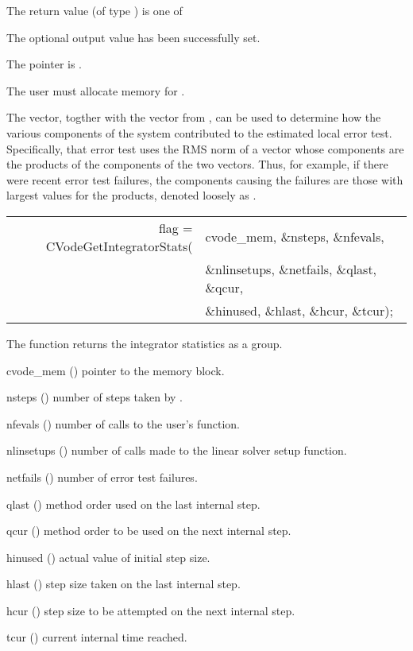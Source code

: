 {
  The return value  (of type ) is one of
  \begin{args}
  \item[\Id{CV\_SUCCESS}] 
    The optional output value has been successfully set.
  \item[\Id{CV\_MEM\_NULL}]
    The  pointer is .
  \end{args}
}
{
  {\warn}The user must allocate memory for .

  The  vector, togther with the  vector from
  , can be used to determine how the various
  components of the system contributed to the estimated local error
  test.  Specifically, that error test uses the RMS norm of a vector
  whose components are the products of the components of the two vectors.
  Thus, for example, if there were recent error test failures, the components
  causing the failures are those with largest values for the products,
  denoted loosely as .
}
{
  \begin{tabular}[t]{@{}r@{}l@{}}
    flag = CVodeGetIntegratorStats(&cvode\_mem, \&nsteps, \&nfevals, \\
                                   &\&nlinsetups, \&netfails, \&qlast, \&qcur, \\
                                   &\&hinused, \&hlast, \&hcur, \&tcur);
  \end{tabular}
}
{
  The function  returns the {\cvodes} integrator
  statistics as a group.
}
{
  \begin{args}[nlinsetups]
  \item[cvode\_mem] ()
    pointer to the {\cvodes} memory block.
  \item[nsteps] ()
    number of steps taken by {\cvodes}.
  \item[nfevals] ()
    number of calls to the user's  function.
  \item[nlinsetups] ()
    number of calls made to the linear solver setup function.
  \item[netfails] ()
    number of error test failures.
  \item[qlast] ()
    method order used on the last internal step.
  \item[qcur] ()
    method order to be used on the next internal step.
  \item[hinused] ()
    actual value of initial step size.
  \item[hlast] ()
    step size taken on the last internal step.
  \item[hcur] ()
    step size to be attempted on the next internal step.
  \item[tcur] ()
    current internal time reached.
  \end{args}
}
